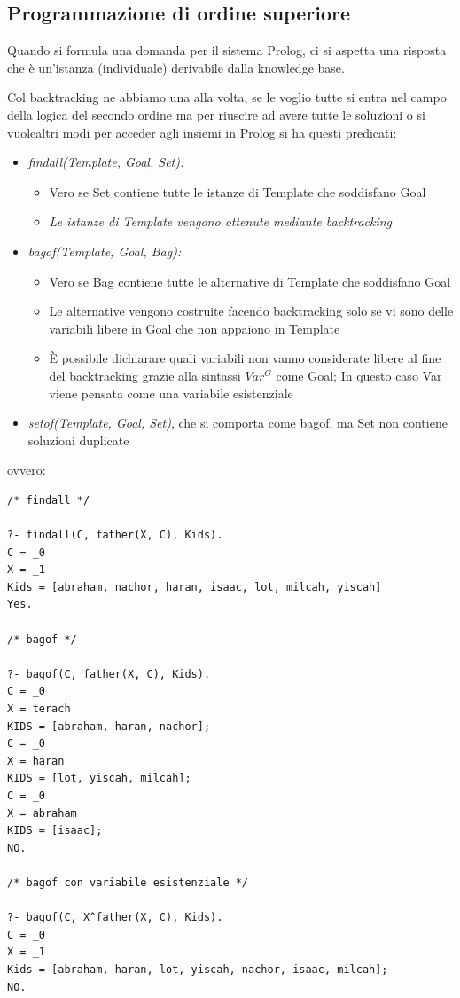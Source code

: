 \documentclass[a4paper]{report}
\begin{document}
\subsection{Programmazione di ordine superiore}
Quando si formula una domanda per il sistema Prolog, ci si aspetta una risposta che è un'istanza (individuale) derivabile dalla knowledge base.

Col backtracking ne abbiamo una alla volta, se le voglio tutte si entra nel campo della logica del secondo ordine ma
per riuscire ad avere tutte le soluzioni o si vuolealtri modi per acceder agli insiemi in Prolog si ha questi predicati:
\begin{itemize}
\item \textit{findall(Template, Goal, Set):} 
\begin{itemize}
\item Vero se Set contiene tutte le istanze di Template che soddisfano Goal
\item \textit{Le istanze di Template vengono ottenute mediante backtracking}
\end{itemize}
\item \textit{bagof(Template, Goal, Bag):}
\begin{itemize}
\item Vero se Bag contiene tutte le alternative di Template che soddisfano Goal
\item Le alternative vengono costruite facendo backtracking solo se vi sono delle variabili libere in Goal che non appaiono in Template
\item È possibile dichiarare quali variabili non vanno considerate libere al fine del backtracking grazie alla sintassi $Var^G$ come Goal; In questo caso Var viene pensata come una variabile esistenziale
\end{itemize}
\item \textit{setof(Template, Goal, Set)}, che si comporta come bagof, ma Set non contiene soluzioni duplicate
\end{itemize}
ovvero:
\begin{verbatim}
/* findall */

?- findall(C, father(X, C), Kids).
C = _0
X = _1
Kids = [abraham, nachor, haran, isaac, lot, milcah, yiscah]
Yes.

/* bagof */

?- bagof(C, father(X, C), Kids).
C = _0
X = terach
KIDS = [abraham, haran, nachor];
C = _0
X = haran
KIDS = [lot, yiscah, milcah];
C = _0
X = abraham
KIDS = [isaac];
NO.

/* bagof con variabile esistenziale */

?- bagof(C, X^father(X, C), Kids).
C = _0
X = _1
Kids = [abraham, haran, lot, yiscah, nachor, isaac, milcah];
NO.
\end{verbatim}
\end{document}
